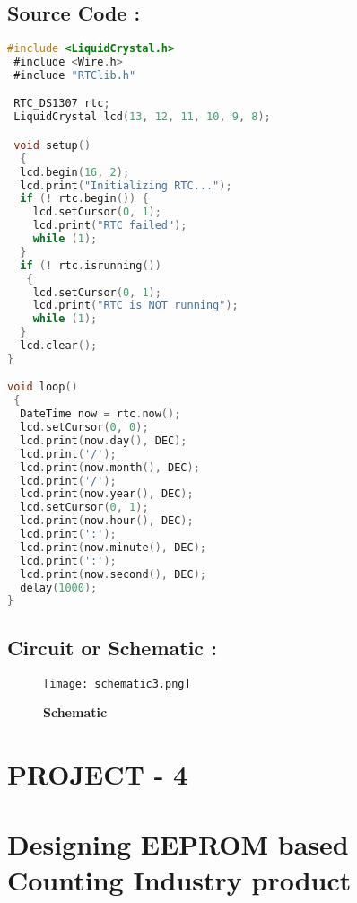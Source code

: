 \documentclass[12pt]{article}
\begin{document}
 \subsection*{\textbf{Source Code :}}
  \begin{lstlisting}[language=C] 
 #include <LiquidCrystal.h>
 #include <Wire.h>
 #include "RTClib.h"

 RTC_DS1307 rtc;
 LiquidCrystal lcd(13, 12, 11, 10, 9, 8);

 void setup()
  {
  lcd.begin(16, 2);
  lcd.print("Initializing RTC...");
  if (! rtc.begin()) {
    lcd.setCursor(0, 1);
    lcd.print("RTC failed");
    while (1);
  }
  if (! rtc.isrunning())
   {
    lcd.setCursor(0, 1);
    lcd.print("RTC is NOT running");
    while (1);
  }
  lcd.clear();
}

void loop()
 {
  DateTime now = rtc.now();
  lcd.setCursor(0, 0);
  lcd.print(now.day(), DEC);  
  lcd.print('/');
  lcd.print(now.month(), DEC);
  lcd.print('/');
  lcd.print(now.year(), DEC);
  lcd.setCursor(0, 1);
  lcd.print(now.hour(), DEC);
  lcd.print(':');
  lcd.print(now.minute(), DEC);
  lcd.print(':');
  lcd.print(now.second(), DEC);
  delay(1000);
}
 \end{lstlisting}
 
  \subsection*{\textbf{Circuit or Schematic :}}
 
    \begin{figure}[h]
\centering
\texttt{[image: schematic3.png]}
\caption{\textbf{Schematic}}
\label{schematic_diagram3}
\end{figure}
 
\pagebreak

\begin{center}
\section*{PROJECT - 4}
\section*{\textbf{Designing EEPROM based Counting Industry  product}}
\end{center}
\end{document}
